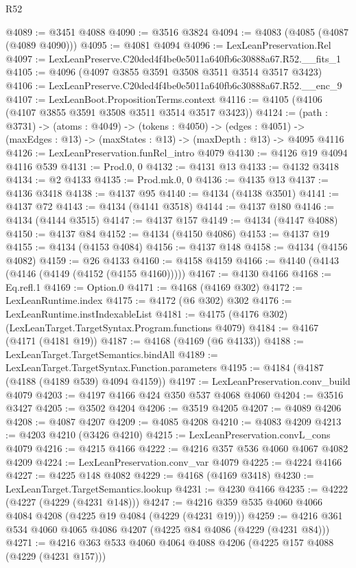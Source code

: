 \begin{lexlean}{R52}
\begin{coremodule}
@4089 := @3451 @4088
@4090 := @3516 @3824
@4094 := @4083 (@4085 (@4087 (@4089 @4090)))
@4095 := @4081 @4094
@4096 := LexLeanPreservation.Rel
@4097 := LexLeanPreserve.C20ded4f4be0e5011a640fb6c30888a67.R52.__fits_1
@4105 := @4096 (@4097 @3855 @3591 @3508 @3511 @3514 @3517 @3423)
@4106 := LexLeanPreserve.C20ded4f4be0e5011a640fb6c30888a67.R52.__enc_9
@4107 := LexLeanBoot.PropositionTerms.context
@4116 := @4105 (@4106 (@4107 @3855 @3591 @3508 @3511 @3514 @3517 @3423))
@4124 := (path : @3731) ->
  (atoms : @4049) ->
  (tokens : @4050) ->
  (edges : @4051) -> (maxEdges : @13) -> (maxStates : @13) -> (maxDepth : @13) -> @4095 @4116
@4126 := LexLeanPreservation.funRel_intro @4079
@4130 := @4126 @19 @4094 @4116 @539
@4131 := Prod.{0, 0}
@4132 := @4131 @13
@4133 := @4132 @3418
@4134 := @2 @4133
@4135 := Prod.mk.{0, 0}
@4136 := @4135 @13
@4137 := @4136 @3418
@4138 := @4137 @95
@4140 := @4134 (@4138 @3501)
@4141 := @4137 @72
@4143 := @4134 (@4141 @3518)
@4144 := @4137 @180
@4146 := @4134 (@4144 @3515)
@4147 := @4137 @157
@4149 := @4134 (@4147 @4088)
@4150 := @4137 @84
@4152 := @4134 (@4150 @4086)
@4153 := @4137 @19
@4155 := @4134 (@4153 @4084)
@4156 := @4137 @148
@4158 := @4134 (@4156 @4082)
@4159 := @26 @4133
@4160 := @4158 @4159
@4166 := @4140 (@4143 (@4146 (@4149 (@4152 (@4155 @4160)))))
@4167 := @4130 @4166
@4168 := Eq.refl.{1}
@4169 := Option.{0}
@4171 := @4168 (@4169 @302)
@4172 := LexLeanRuntime.index
@4175 := @4172 (@6 @302) @302
@4176 := LexLeanRuntime.instIndexableList
@4181 := @4175 (@4176 @302) (LexLeanTarget.TargetSyntax.Program.functions @4079)
@4184 := @4167 (@4171 (@4181 @19))
@4187 := @4168 (@4169 (@6 @4133))
@4188 := LexLeanTarget.TargetSemantics.bindAll
@4189 := LexLeanTarget.TargetSyntax.Function.parameters
@4195 := @4184 (@4187 (@4188 (@4189 @539) @4094 @4159))
@4197 := LexLeanPreservation.conv_build @4079
@4203 := @4197 @4166 @424 @350 @537 @4068 @4060
@4204 := @3516 @3427
@4205 := @3502 @4204
@4206 := @3519 @4205
@4207 := @4089 @4206
@4208 := @4087 @4207
@4209 := @4085 @4208
@4210 := @4083 @4209
@4213 := @4203 @4210 (@3426 @4210)
@4215 := LexLeanPreservation.convL_cons @4079
@4216 := @4215 @4166
@4222 := @4216 @357 @536 @4060 @4067 @4082 @4209
@4224 := LexLeanPreservation.conv_var @4079
@4225 := @4224 @4166
@4227 := @4225 @148 @4082
@4229 := @4168 (@4169 @3418)
@4230 := LexLeanTarget.TargetSemantics.lookup
@4231 := @4230 @4166
@4235 := @4222 (@4227 (@4229 (@4231 @148)))
@4247 := @4216 @359 @535 @4060 @4066 @4084 @4208 (@4225 @19 @4084 (@4229 (@4231 @19)))
@4259 := @4216 @361 @534 @4060 @4065 @4086 @4207 (@4225 @84 @4086 (@4229 (@4231 @84)))
@4271 := @4216 @363 @533 @4060 @4064 @4088 @4206 (@4225 @157 @4088 (@4229 (@4231 @157)))

\end{coremodule}
\end{lexlean}
